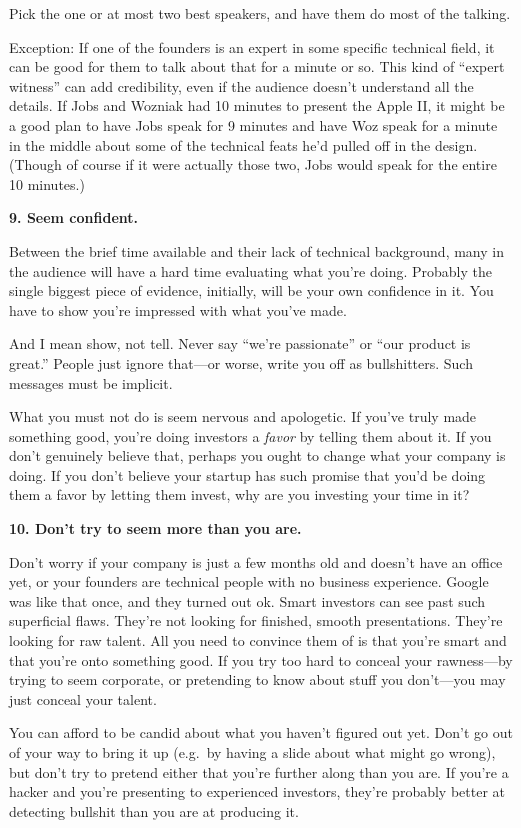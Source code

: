 \documentclass[12pt]{book}
\begin{document}
Pick the one or at most two best speakers, and have them do most of the
talking.

Exception: If one of the founders is an expert in some specific
technical field, it can be good for them to talk about that for a minute
or so. This kind of ``expert witness'' can add credibility, even if the
audience doesn't understand all the details. If Jobs and Wozniak had 10
minutes to present the Apple II, it might be a good plan to have Jobs
speak for 9 minutes and have Woz speak for a minute in the middle about
some of the technical feats he'd pulled off in the design. (Though of
course if it were actually those two, Jobs would speak for the entire 10
minutes.)

\textbf{9. Seem confident.}

Between the brief time available and their lack of technical background,
many in the audience will have a hard time evaluating what you're doing.
Probably the single biggest piece of evidence, initially, will be your
own confidence in it. You have to show you're impressed with what you've
made.

And I mean show, not tell. Never say ``we're passionate'' or ``our
product is great.'' People just ignore that---or worse, write you off as
bullshitters. Such messages must be implicit.

What you must not do is seem nervous and apologetic. If you've truly
made something good, you're doing investors a \emph{favor} by telling
them about it. If you don't genuinely believe that, perhaps you ought to
change what your company is doing. If you don't believe your startup has
such promise that you'd be doing them a favor by letting them invest,
why are you investing your time in it?

\textbf{10. Don't try to seem more than you are.}

Don't worry if your company is just a few months old and doesn't have an
office yet, or your founders are technical people with no business
experience. Google was like that once, and they turned out ok. Smart
investors can see past such superficial flaws. They're not looking for
finished, smooth presentations. They're looking for raw talent. All you
need to convince them of is that you're smart and that you're onto
something good. If you try too hard to conceal your rawness---by trying
to seem corporate, or pretending to know about stuff you don't---you may
just conceal your talent.

You can afford to be candid about what you haven't figured out yet.
Don't go out of your way to bring it up (e.g.~by having a slide about
what might go wrong), but don't try to pretend either that you're
further along than you are. If you're a hacker and you're presenting to
experienced investors, they're probably better at detecting bullshit
than you are at producing it.
\end{document}
